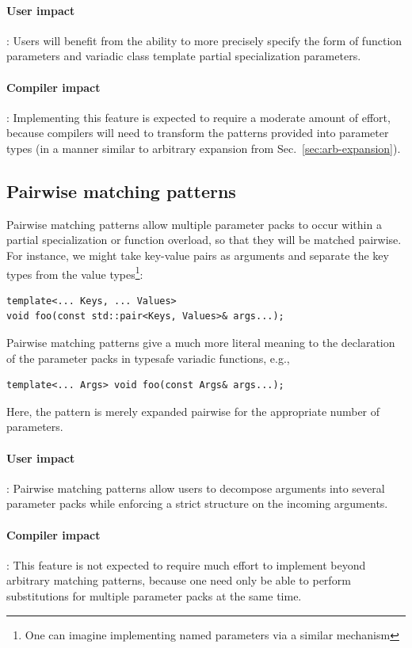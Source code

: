 \documentclass{article}
\begin{document}
\paragraph{User impact}: Users will benefit from the ability to more
precisely specify the form of function parameters and variadic class
template partial specialization parameters.

\paragraph{Compiler impact}: Implementing this feature is expected to
require a moderate amount of effort, because compilers will need to
transform the patterns provided into parameter types (in a manner
similar to arbitrary expansion from Sec.~\ref{sec:arb-expansion}).

\subsection{Pairwise matching patterns}
Pairwise matching patterns allow multiple parameter packs to occur
within a partial specialization or function overload, so that they
will be matched pairwise. For instance, we might take key-value pairs
as arguments and separate the key types from the value
types\footnote{One can imagine implementing named parameters via a
  similar mechanism}:

\begin{verbatim}
template<... Keys, ... Values>
void foo(const std::pair<Keys, Values>& args...);
\end{verbatim}

Pairwise matching patterns give a much more literal meaning to the
declaration of the parameter packs in typesafe variadic functions, e.g.,

\begin{verbatim}
template<... Args> void foo(const Args& args...);
\end{verbatim}

Here, the pattern is merely expanded pairwise for the appropriate
number of parameters.

\paragraph{User impact}: Pairwise matching patterns allow users to
decompose arguments into several parameter packs while enforcing a
strict structure on the incoming arguments.

\paragraph{Compiler impact}: This feature is not expected to require
much effort to implement beyond arbitrary matching patterns, because
one need only be able to perform substitutions for multiple parameter
packs at the same time.
\end{document}
